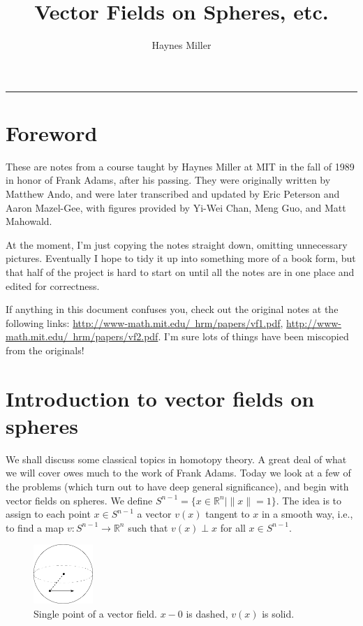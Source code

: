 \documentclass{article}
\title{Vector Fields on Spheres, etc.}
\author{Haynes Miller}
\providecommand{\OutputFrontMatter}{}
\providecommand{\OutputForeword}{0}
\providecommand{\OutputIntroductionToVectorFieldsOnSpheres}{1}
\newcommand{\R}{\mathbb{R}}
\begin{document}

\ifx\OutputFrontMatter\undefined\hrule\else
\maketitle
\tableofcontents
\fi

\section{Foreword} %
\label{Foreword}
\ifx\OutputForeword\undefined\else
These are notes from a course taught by Haynes Miller at MIT in the fall of 1989 in honor of Frank Adams, after his passing.  They were originally written by Matthew Ando, and were later transcribed and updated by Eric Peterson and Aaron Mazel-Gee, with figures provided by Yi-Wei Chan, Meng Guo, and Matt Mahowald.

At the moment, I'm just copying the notes straight down, omitting unnecessary pictures.  Eventually I hope to tidy it up into something more of a book form, but that half of the project is hard to start on until all the notes are in one place and edited for correctness.

If anything in this document confuses you, check out the original notes at the following links: \href{http://www-math.mit.edu/~hrm/papers/vf1.pdf}{http://www-math.mit.edu/~hrm/papers/vf1.pdf}, \href{http://www-math.mit.edu/~hrm/papers/vf2.pdf}{http://www-math.mit.edu/~hrm/papers/vf2.pdf}.  I'm sure lots of things have been miscopied from the originals!

\fi
\section{Introduction to vector fields on spheres} %
\label{IntroductionToVectorFieldsOnSpheres}
\ifx\OutputIntroductionToVectorFieldsOnSpheres\undefined\else

We shall discuss some classical topics in homotopy theory.  A great deal of what we will cover owes much to the work of Frank Adams.  Today we look at a few of the problems (which turn out to have deep general significance), and begin with vector fields on spheres.  We define $S^{n-1} = \{x \in \R^n \mid \|x\| = 1\}$.  The idea is to assign to each point $x \in S^{n-1}$ a vector $v(x)$ tangent to $x$ in a smooth way, i.e., to find a map $v: S^{n-1} \to \R^n$ such that $v(x) \perp x$ for all $x \in S^{n-1}$.

\begin{figure}
\centering\includegraphics[width=0.2\textwidth]{figures/fig1.pdf}
\caption{\small Single point of a vector field. $x - 0$ is dashed, $v(x)$ is solid.}
\end{figure}
\end{document}

